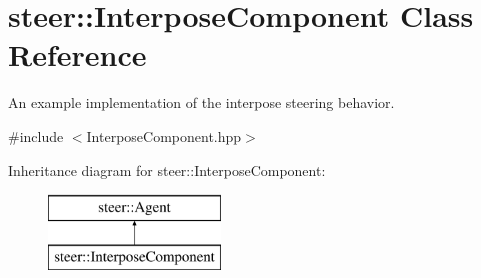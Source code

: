 \hypertarget{classsteer_1_1_interpose_component}{\section{steer\-:\-:Interpose\-Component Class Reference}
\label{classsteer_1_1_interpose_component}
}


An example implementation of the interpose steering behavior.  




{\ttfamily \#include $<$Interpose\-Component.\-hpp$>$}

Inheritance diagram for steer\-:\-:Interpose\-Component\-:\begin{figure}[H]
\begin{center}
\leavevmode
\includegraphics[height=2.000000cm]{classsteer_1_1_interpose_component}
\end{center}
\end{figure}
